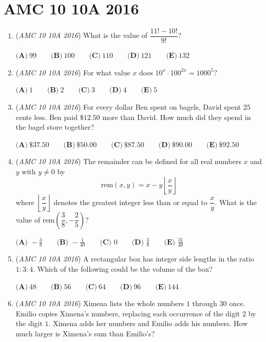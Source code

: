 \section{AMC 10 10A 2016}
        \begin{enumerate}
        	\item (\textit{AMC 10 10A 2016}) What is the value of $\dfrac{11!-10!}{9!}$?


 $\textbf{(A)}\ 99\qquad\textbf{(B)}\ 100\qquad\textbf{(C)}\ 110\qquad\textbf{(D)}\ 121\qquad\textbf{(E)}\ 132$


	\item (\textit{AMC 10 10A 2016}) For what value $x$ does $10^{x}\cdot 100^{2x}=1000^{5}$?


 $\textbf{(A)}\ 1 \qquad\textbf{(B)}\ 2\qquad\textbf{(C)}\ 3\qquad\textbf{(D)}\ 4\qquad\textbf{(E)}\ 5$


	\item (\textit{AMC 10 10A 2016}) For every dollar Ben spent on bagels, David spent $25$ cents less. Ben paid $\$12.50$ more than David. How much did they spend in the bagel store together?


 $\textbf{(A)}\ \$37.50 \qquad\textbf{(B)}\ \$50.00\qquad\textbf{(C)}\ \$87.50\qquad\textbf{(D)}\ \$90.00\qquad\textbf{(E)}\ \$92.50$


	\item (\textit{AMC 10 10A 2016}) The remainder can be defined for all real numbers $x$ and $y$ with $y \neq 0$ by 
 \[\text{rem} (x ,y)=x-y\left \lfloor \frac{x}{y} \right \rfloor\]where $\left \lfloor \dfrac{x}{y} \right \rfloor$ denotes the greatest integer less than or equal to $\dfrac{x}{y}$. What is the value of $\text{rem}\left(\dfrac{3}{8}, -\dfrac{2}{5}\right)$?


 $\textbf{(A) } -\frac{3}{8} \qquad \textbf{(B) } -\frac{1}{40} \qquad \textbf{(C) } 0 \qquad \textbf{(D) } \frac{3}{8} \qquad \textbf{(E) } \frac{31}{40}$


	\item (\textit{AMC 10 10A 2016}) A rectangular box has integer side lengths in the ratio $1: 3: 4$. Which of the following could be the volume of the box?


 $\textbf{(A)}\ 48\qquad\textbf{(B)}\ 56\qquad\textbf{(C)}\ 64\qquad\textbf{(D)}\ 96\qquad\textbf{(E)}\ 144$


	\item (\textit{AMC 10 10A 2016}) Ximena lists the whole numbers $1$ through $30$ once. Emilio copies Ximena's numbers, replacing each occurrence of the digit $2$ by the digit $1$. Ximena adds her numbers and Emilio adds his numbers. How much larger is Ximena's sum than Emilio's?



\end{enumerate}
